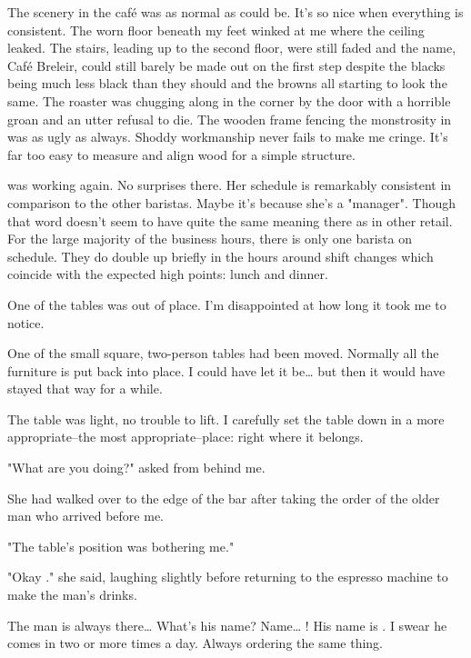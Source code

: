 %
\noindent
The scenery in the caf\'e was as normal as could be.
It's so nice when everything is consistent.
The worn floor beneath my feet winked at me where the ceiling leaked.
The stairs, leading up to the second floor, were still faded and the name,
Caf\'e Breleir, could still barely be made out on the first step despite
the blacks being much less black than they should and the browns all
starting to look the same. The roaster was chugging along
in the corner by the door with a horrible groan and an utter refusal to die.
The wooden frame fencing the monstrosity in was as ugly as always.
Shoddy workmanship never fails to make me cringe.
It's far too easy to measure and align wood for a simple structure.


\april{} was working again.  No surprises there.
Her schedule is remarkably consistent in comparison to the other baristas.
Maybe it's because she's a "manager".  Though that word doesn't seem to
have quite the same meaning there as in other retail.
For the large majority of the business hours, there is only one barista
on schedule.  They do double up briefly in the hours around shift changes
which coincide with the expected high points: lunch and dinner.


One of the tables was out of place.
I'm disappointed at how long it took me to notice.


One of the small square, two-person tables had been moved.
Normally all the furniture is put back into place.
I could have let it be\ldots{} but then it would have
stayed that way for a while.


The table was light, no trouble to lift.
I carefully set the table down in a more
appropriate--the most appropriate--place:
right where it belongs.
\VV


"What are you doing?" \april{} asked from behind me.
\VV


\noindent
She had walked over to the edge of the bar after taking the order
of the older man who arrived before me.
\VV


"The table's position was bothering me."
\VV


"Okay \josh." she said, laughing slightly before returning to
the espresso machine to make the man's drinks.
\VV


\noindent
The man is always there\ldots{} What's his name? Name\ldots{} \dameon!
His name is \dameon. I swear he comes in two or more times a day.
Always ordering the same thing.
\VV



